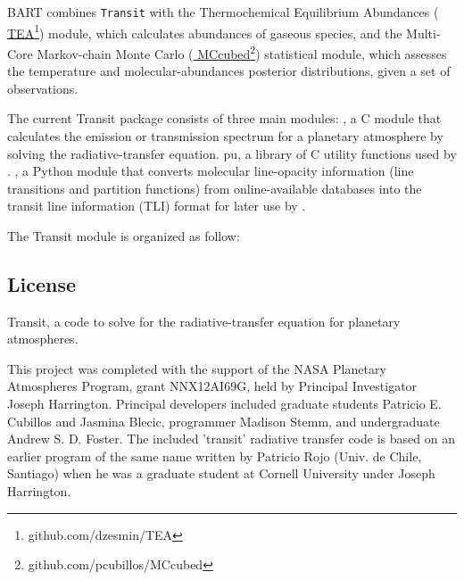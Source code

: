 \documentclass[letterpaper, 12pt]{article}
\begin{document}
{\tttm BART} combines {\tt Transit} with the Thermochemical
Equilibrium Abundances (\href{https://github.com/dzesmin/TEA} {\tttm
  TEA}\footnote{github.com/dzesmin/TEA}) module, which calculates
abundances of gaseous species, and the Multi-Core Markov-chain Monte
Carlo (\href{https://github.com/pcubillos/MCcubed} {\tttm
  MCcubed}\footnote{github.com/pcubillos/MCcubed}) statistical module,
which assesses the temperature and molecular-abundances posterior
distributions, given a set of observations.

The current {\tttm Transit} package consists of three main modules:
{\transit} , a C module that
calculates the emission or transmission spectrum for a planetary
atmosphere by solving the radiative-transfer equation.
{\tttm pu}, a library of C utility functions used by {\transit}.
{\pylineread}, a Python module that converts molecular line-opacity
information (line transitions and partition functions)
from online-available databases into the transit line information
(TLI) format for later use by {\transit}. \newline

\noindent The Transit module is organized as follow: 

\vspace{0.7cm}

\pagebreak
\subsection{License}

Transit, a code to solve for the radiative-transfer equation for
planetary atmospheres. \newline

This project was completed with the support of the NASA Planetary
Atmospheres Program, grant NNX12AI69G, held by Principal Investigator
Joseph Harrington. Principal developers included graduate students
Patricio E. Cubillos and Jasmina Blecic, programmer Madison Stemm, and
undergraduate Andrew S. D. Foster.  The included 'transit' radiative
transfer code is based on an earlier program of the same name written
by Patricio Rojo (Univ. de Chile, Santiago) when he was a graduate
student at Cornell University under Joseph Harrington. \newline
\end{document}
